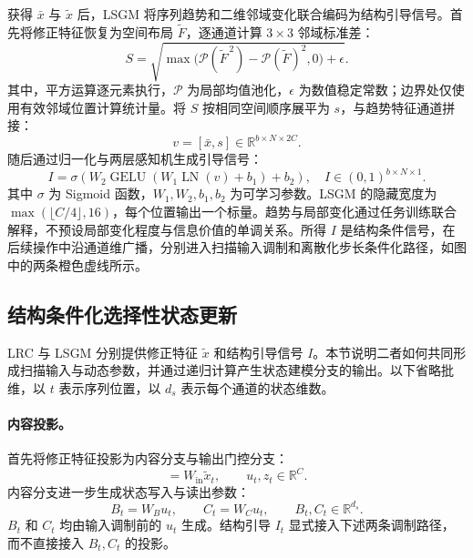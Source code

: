 \documentclass[UTF8,12pt,a4paper]{ctexart}
\begin{document}
获得 $\bar{x}$ 与 $\tilde{x}$ 后，LSGM 将序列趋势和二维邻域变化联合编码为结构引导信号。首先将修正特征恢复为空间布局 $\widetilde{F}$，逐通道计算 $3\times3$ 邻域标准差：
\begin{equation}
S=\sqrt{\max\bigl(\mathcal{P}(\widetilde{F}^{\,2})-\mathcal{P}(\widetilde{F})^{2},0\bigr)+\epsilon}.
\label{eq:local_std}
\end{equation}
其中，平方运算逐元素执行，$\mathcal{P}$ 为局部均值池化，$\epsilon$ 为数值稳定常数；边界处仅使用有效邻域位置计算统计量。将 $S$ 按相同空间顺序展平为 $s$，与趋势特征通道拼接：
\begin{equation}
v=[\bar{x},s]\in\mathbb{R}^{b\times N\times2C}.
\label{eq:structural_descriptor}
\end{equation}
随后通过归一化与两层感知机生成引导信号：
\begin{equation}
I=\sigma\!\left(W_2\operatorname{GELU}\!\left(W_1\operatorname{LN}(v)+b_1\right)+b_2\right),
\quad I\in(0,1)^{b\times N\times1}.
\label{eq:importance}
\end{equation}
其中 $\sigma$ 为 Sigmoid 函数，$W_1,W_2,b_1,b_2$ 为可学习参数。LSGM 的隐藏宽度为 $\max(\lfloor C/4\rfloor,16)$，每个位置输出一个标量。趋势与局部变化通过任务训练联合解释，不预设局部变化程度与信息价值的单调关系。所得 $I$ 是结构条件信号，在后续操作中沿通道维广播，分别进入扫描输入调制和离散化步长条件化路径，如图中的两条橙色虚线所示。

\subsection{结构条件化选择性状态更新}
\label{sec:structure_conditioned_ssm}

LRC 与 LSGM 分别提供修正特征 $\tilde{x}$ 和结构引导信号 $I$。本节说明二者如何共同形成扫描输入与动态参数，并通过递归计算产生状态建模分支的输出。以下省略批维，以 $t$ 表示序列位置，以 $d_s$ 表示每个通道的状态维数。

\paragraph{内容投影。}
首先将修正特征投影为内容分支与输出门控分支：
\begin{equation}
[u_t,z_t]=W_{\mathrm{in}}\tilde{x}_t,\qquad u_t,z_t\in\mathbb{R}^{C}.
\label{eq:input_projection}
\end{equation}
内容分支进一步生成状态写入与读出参数：
\begin{equation}
B_t=W_Bu_t,\qquad C_t=W_Cu_t,\qquad B_t,C_t\in\mathbb{R}^{d_s}.
\label{eq:ssm_parameters}
\end{equation}
$B_t$ 和 $C_t$ 均由输入调制前的 $u_t$ 生成。结构引导 $I_t$ 显式接入下述两条调制路径，而不直接接入 $B_t,C_t$ 的投影。
\end{document}

